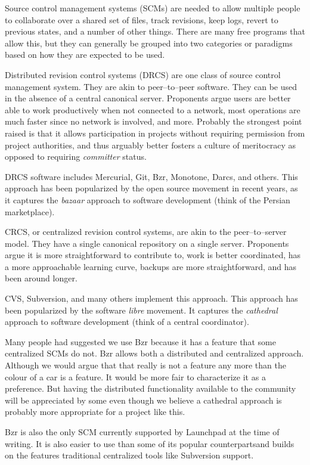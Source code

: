 
Source control management systems (SCMs) are needed to allow multiple people to collaborate over a shared set of files, track revisions, keep logs, revert to previous states, and a number of other things. There are many free programs that allow this, but they can generally be grouped into two categories or paradigms based on how they are expected to be used.

Distributed revision control systems (DRCS) are one class of source control management system. They are akin to peer--to--peer software. They can be used in the absence of a central canonical server. Proponents argue users are better able to work productively when not connected to a network, most operations are much faster since no network is involved, and more. Probably the strongest point raised is that it allows participation in projects without requiring permission from project authorities, and thus arguably better fosters a culture of meritocracy as opposed to requiring {\it committer} status. 

DRCS software includes Mercurial, Git, Bzr, Monotone, Darcs, and others. This approach has been popularized by the open source movement in recent years, as it captures the {\it bazaar} approach to software development (think of the Persian marketplace).

CRCS, or centralized revision control systems, are akin to the peer--to--server model. They have a single canonical repository on a single server. Proponents argue it is more straightforward to contribute to, work is better coordinated, has a more approachable learning curve, backups are more straightforward, and has been around longer. 

CVS, Subversion, and many others implement this approach. This approach has been popularized by the software {\it libre} movement. It captures the {\it cathedral} approach to software development (think of a central coordinator).

Many people had suggested we use Bzr because it has a feature that some centralized SCMs do not. Bzr allows both a distributed and centralized approach. Although we would argue that that really is not a feature any more than the colour of a car is a feature. It would be more fair to characterize it as a preference. But having the distributed functionality available to the community will be appreciated by some even though we believe a cathedral approach is probably more appropriate for a project like this. 

Bzr is also the only SCM currently supported by Launchpad at the time of writing. It is also easier to use than some of its popular counterparts and builds on the features traditional centralized tools like Subversion support.

